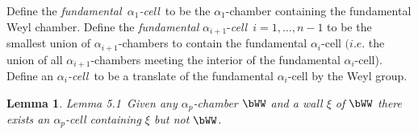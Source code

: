 \documentclass{memo-l}
\newtheorem{lemma}[theorem]{Lemma}
\theoremstyle{definition}
\theoremstyle{remark}
\numberwithin{section}{chapter}
\numberwithin{equation}{chapter}
\begin{document}
   Define the {\it fundamental\ ${\alpha}_{1}$-cell}\ to be the
${\alpha}_{1}$-chamber containing the fundamental Weyl chamber.  Define the
{\it fundamental} ${\alpha}_{i+1}$-{\it cell}\ $i = 1,\ldots ,{n-1}$ to be
the smallest union of ${\alpha}_{i+1}$-chambers to contain the fundamental
${\alpha}_{i}$-cell $(i.e$.  the union of all ${\alpha}_{i+1}$-chambers
meeting the interior of the fundamental ${\alpha}_{i}$-cell).  Define an
{\it ${\alpha}_{i}$-cell}\ to be a translate of the fundamental
${\alpha}_{i}$-cell by the Weyl group.
 
\begin{lemma}{Lemma 5.1}\ Given any ${\alpha}_{p}$-chamber
$\bWW$ and a wall ${\xi}$ of $\bWW$ there 
exists an ${\alpha}_{p}$-cell containing ${\xi}$ but not $\bWW$.
\end{lemma}

\medpagebreak
\end{document}
